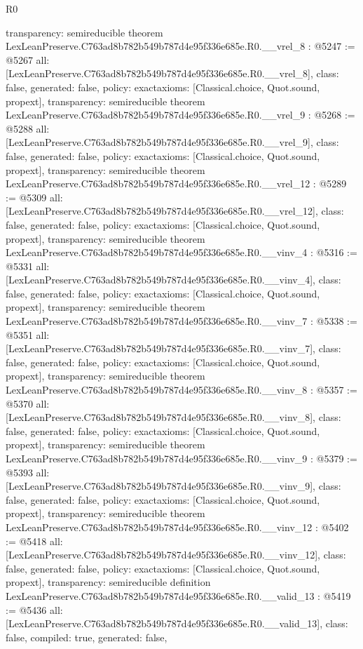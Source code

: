 \begin{lexlean}{R0}
\begin{coremodule}
{  transparency: semireducible
}
theorem LexLeanPreserve.C763ad8b782b549b787d4e95f336e685e.R0.__vrel_8 : @5247 := @5267 {
  all: [LexLeanPreserve.C763ad8b782b549b787d4e95f336e685e.R0.__vrel_8],
  class: false,
  generated: false,
  policy: exact{axioms: [Classical.choice, Quot.sound, propext]},
  transparency: semireducible
}
theorem LexLeanPreserve.C763ad8b782b549b787d4e95f336e685e.R0.__vrel_9 : @5268 := @5288 {
  all: [LexLeanPreserve.C763ad8b782b549b787d4e95f336e685e.R0.__vrel_9],
  class: false,
  generated: false,
  policy: exact{axioms: [Classical.choice, Quot.sound, propext]},
  transparency: semireducible
}
theorem LexLeanPreserve.C763ad8b782b549b787d4e95f336e685e.R0.__vrel_12 : @5289 := @5309 {
  all: [LexLeanPreserve.C763ad8b782b549b787d4e95f336e685e.R0.__vrel_12],
  class: false,
  generated: false,
  policy: exact{axioms: [Classical.choice, Quot.sound, propext]},
  transparency: semireducible
}
theorem LexLeanPreserve.C763ad8b782b549b787d4e95f336e685e.R0.__vinv_4 : @5316 := @5331 {
  all: [LexLeanPreserve.C763ad8b782b549b787d4e95f336e685e.R0.__vinv_4],
  class: false,
  generated: false,
  policy: exact{axioms: [Classical.choice, Quot.sound, propext]},
  transparency: semireducible
}
theorem LexLeanPreserve.C763ad8b782b549b787d4e95f336e685e.R0.__vinv_7 : @5338 := @5351 {
  all: [LexLeanPreserve.C763ad8b782b549b787d4e95f336e685e.R0.__vinv_7],
  class: false,
  generated: false,
  policy: exact{axioms: [Classical.choice, Quot.sound, propext]},
  transparency: semireducible
}
theorem LexLeanPreserve.C763ad8b782b549b787d4e95f336e685e.R0.__vinv_8 : @5357 := @5370 {
  all: [LexLeanPreserve.C763ad8b782b549b787d4e95f336e685e.R0.__vinv_8],
  class: false,
  generated: false,
  policy: exact{axioms: [Classical.choice, Quot.sound, propext]},
  transparency: semireducible
}
theorem LexLeanPreserve.C763ad8b782b549b787d4e95f336e685e.R0.__vinv_9 : @5379 := @5393 {
  all: [LexLeanPreserve.C763ad8b782b549b787d4e95f336e685e.R0.__vinv_9],
  class: false,
  generated: false,
  policy: exact{axioms: [Classical.choice, Quot.sound, propext]},
  transparency: semireducible
}
theorem LexLeanPreserve.C763ad8b782b549b787d4e95f336e685e.R0.__vinv_12 : @5402 := @5418 {
  all: [LexLeanPreserve.C763ad8b782b549b787d4e95f336e685e.R0.__vinv_12],
  class: false,
  generated: false,
  policy: exact{axioms: [Classical.choice, Quot.sound, propext]},
  transparency: semireducible
}
definition LexLeanPreserve.C763ad8b782b549b787d4e95f336e685e.R0.__valid_13 : @5419 := @5436 {
  all: [LexLeanPreserve.C763ad8b782b549b787d4e95f336e685e.R0.__valid_13],
  class: false,
  compiled: true,
  generated: false,
}
\end{coremodule}
\end{lexlean}
